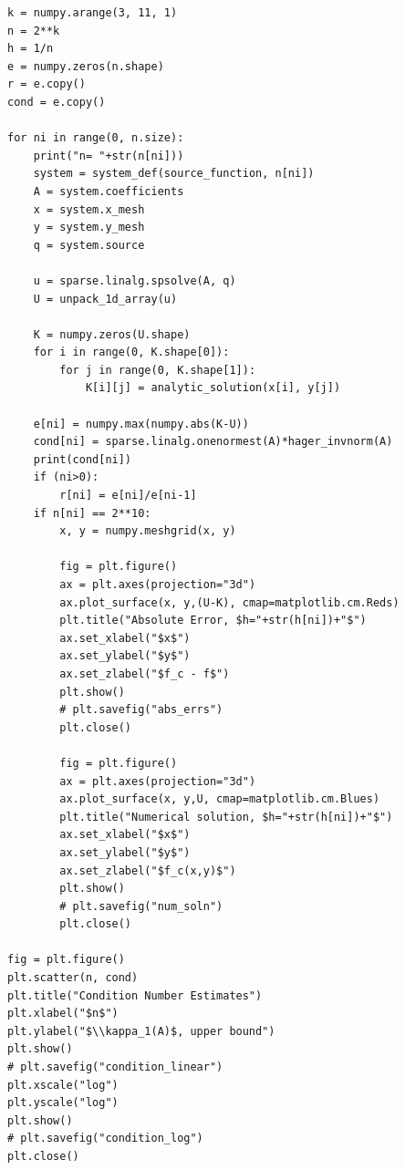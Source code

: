 \documentclass{template}
\begin{document}
\begin{verbatim}
k = numpy.arange(3, 11, 1)
n = 2**k
h = 1/n
e = numpy.zeros(n.shape)
r = e.copy()
cond = e.copy()

for ni in range(0, n.size):
    print("n= "+str(n[ni]))
    system = system_def(source_function, n[ni])
    A = system.coefficients
    x = system.x_mesh
    y = system.y_mesh
    q = system.source

    u = sparse.linalg.spsolve(A, q)
    U = unpack_1d_array(u)
 
    K = numpy.zeros(U.shape)
    for i in range(0, K.shape[0]):
        for j in range(0, K.shape[1]):
            K[i][j] = analytic_solution(x[i], y[j])

    e[ni] = numpy.max(numpy.abs(K-U))
    cond[ni] = sparse.linalg.onenormest(A)*hager_invnorm(A)
    print(cond[ni])
    if (ni>0):
        r[ni] = e[ni]/e[ni-1]
    if n[ni] == 2**10:
        x, y = numpy.meshgrid(x, y)

        fig = plt.figure()
        ax = plt.axes(projection="3d")
        ax.plot_surface(x, y,(U-K), cmap=matplotlib.cm.Reds)
        plt.title("Absolute Error, $h="+str(h[ni])+"$")
        ax.set_xlabel("$x$")
        ax.set_ylabel("$y$")
        ax.set_zlabel("$f_c - f$")
        plt.show()
        # plt.savefig("abs_errs")
        plt.close()

        fig = plt.figure()
        ax = plt.axes(projection="3d")
        ax.plot_surface(x, y,U, cmap=matplotlib.cm.Blues)
        plt.title("Numerical solution, $h="+str(h[ni])+"$")
        ax.set_xlabel("$x$")
        ax.set_ylabel("$y$")
        ax.set_zlabel("$f_c(x,y)$")
        plt.show()
        # plt.savefig("num_soln")
        plt.close()

fig = plt.figure()
plt.scatter(n, cond)
plt.title("Condition Number Estimates")
plt.xlabel("$n$")
plt.ylabel("$\\kappa_1(A)$, upper bound")
plt.show()
# plt.savefig("condition_linear")
plt.xscale("log")
plt.yscale("log")
plt.show()
# plt.savefig("condition_log")
plt.close()

\end{verbatim}
\end{document}
